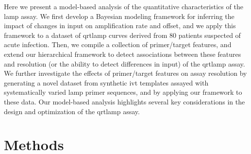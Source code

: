 \documentclass[../thesis.tex]{subfiles}
\begin{document}
Here we present a model-based analysis of the quantitative characteristics of the \gls{lamp} assay. We first develop a Bayesian modeling framework for inferring the impact of changes in  input on amplification rate and offset, and we apply this framework to a dataset of \gls{qrtlamp} curves derived from 80 patients suspected of acute infection. Then, we compile a collection of primer/target features, and extend our hierarchical framework to detect associations between these features and resolution (or the ability to detect differences in  input) of the \gls{qrtlamp} assay. We further investigate the effects of primer/target features on assay resolution by generating a novel dataset from synthetic \gls{ivt}  templates assayed with systematically varied \gls{lamp} primer sequences, and by applying our framework to these data. Our model-based analysis highlights several key considerations in the design and optimization of the \gls{qrtlamp} assay.

 

\enlargethispage{12pt}


\section{Methods}
\end{document}
